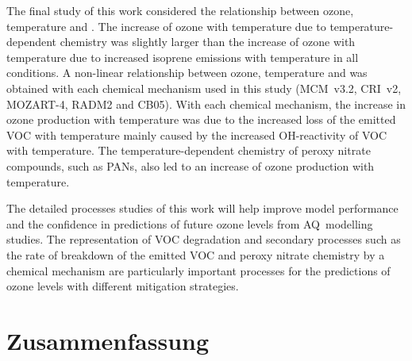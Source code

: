The final study of this work considered the relationship between ozone, temperature and .
The increase of ozone with temperature due to temperature-dependent chemistry was slightly larger than the increase of ozone with temperature due to increased isoprene emissions with temperature in all  conditions.
A non-linear relationship between ozone, temperature and  was obtained with each chemical mechanism used in this study (MCM~v3.2, CRI~v2, MOZART-4, RADM2 and CB05).
With each chemical mechanism, the increase in ozone production with temperature was due to the increased loss of the emitted VOC with temperature mainly caused by the increased OH-reactivity of VOC with temperature.
The temperature-dependent chemistry of peroxy nitrate compounds, such as PANs, also led to an increase of ozone production with temperature.

The detailed processes studies of this work will help improve model performance and the confidence in predictions of future ozone levels from AQ~modelling studies.
The representation of VOC degradation and secondary processes such as the rate of breakdown of the emitted VOC and peroxy nitrate chemistry by a chemical mechanism are particularly important processes for the predictions of ozone levels with different mitigation strategies.

\section{Zusammenfassung}
